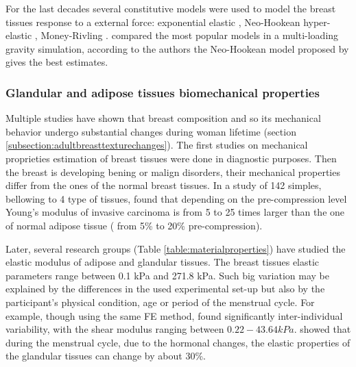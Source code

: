 For the last decades several constitutive models were used to model the breast tissues response to a external force: exponential elastic \citep{azar_methods_2002}, Neo-Hookean hyper-elastic \citep{carter_biomechanical_2009,rajagopal_modeling_2010,sturgeon_finite_element_2016, eiben_breast_2016, han_nonlinear_2014, garcia_mapping_2017}, Money-Rivling \citep{samani_elastic_2007,tanner_factors_2006,carter_application_2012,martinez_finite_2017}. \cite{eder_comparison_2014} compared the most popular models in a multi-loading gravity simulation, according to the authors the Neo-Hookean model proposed by \cite{rajagopal_creating_2008} gives the best estimates.

\subsubsection*{Glandular and adipose tissues biomechanical properties }
 Multiple studies have shown that breast composition and so its mechanical behavior undergo substantial changes during woman lifetime (section \ref{subsection:adultbreasttexturechanges}). The first studies on mechanical proprieties estimation of breast tissues were done in diagnostic purposes. Then the breast is developing bening or malign disorders, their mechanical properties differ from the ones of the normal breast tissues.  In a study of 142 simples, bellowing to 4 type of tissues,  \cite{krouskop_elastic_1998} found that depending on the pre-compression level Young’s modulus of invasive carcinoma is from 5 to 25 times larger than the one of normal adipose tissue  ( from 5\% to 20\% pre-compression).  

Later, several research groups (Table \ref{table:materialproperties}) have studied the elastic modulus of adipose and glandular tissues. The breast tissues elastic parameters range between 0.1 kPa and 271.8 kPa. Such big variation may be explained by the differences in the used experimental set-up but also by the participant's physical condition, age or period of the menstrual cycle. For example, \cite{han_development_2012} though using the same FE method, found significantly inter-individual variability, with the shear modulus ranging between $0.22-43.64 kPa$. \cite{lorenzen_menstrual-cycle_2003} showed that during the menstrual cycle, due to the hormonal changes, the elastic properties of the glandular tissues can change by about 30\%.

